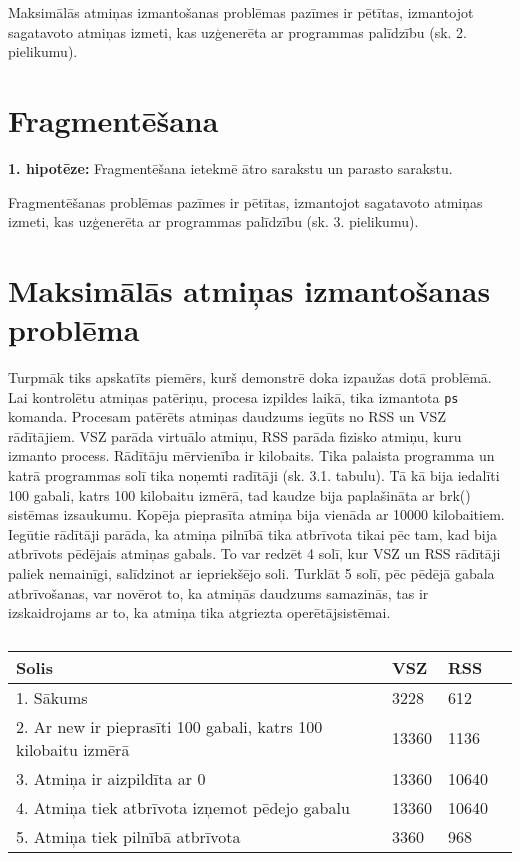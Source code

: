 Maksimālās atmiņas izmantošanas problēmas pazīmes ir pētītas, izmantojot sagatavoto atmiņas izmeti, kas uzģenerēta ar programmas palīdzību (sk. 2. pielikumu).

\section{Fragmentēšana}


\textbf{1. hipotēze:} Fragmentēšana ietekmē ātro sarakstu un parasto sarakstu.

Fragmentēšanas problēmas pazīmes ir pētītas, izmantojot sagatavoto atmiņas izmeti, kas uzģenerēta ar programmas palīdzību (sk. 3. pielikumu).







\section{Maksimālās atmiņas izmantošanas problēma}



Turpmāk tiks apskatīts piemērs, kurš demonstrē doka izpaužas dotā problēmā.
Lai kontrolētu atmiņas patēriņu, procesa izpildes laikā, tika izmantota \texttt{ps} komanda.
Procesam patērēts atmiņas daudzums iegūts no RSS un VSZ rādītājiem.
VSZ parāda virtuālo atmiņu, RSS parāda fizisko atmiņu, kuru izmanto process.
Rādītāju mērvienība ir kilobaits.
Tika palaista programma un katrā programmas solī tika noņemti radītāji (sk. 3.1. tabulu).
Tā kā bija iedalīti 100 gabali, katrs 100 kilobaitu izmērā, tad kaudze bija paplašināta ar brk() sistēmas izsaukumu.
Kopēja pieprasīta atmiņa bija vienāda ar 10000 kilobaitiem.
Iegūtie rādītāji parāda, ka atmiņa pilnībā tika atbrīvota tikai pēc tam, kad bija atbrīvots pēdējais atmiņas gabals.
To var redzēt 4 solī, kur VSZ un RSS rādītāji paliek nemainīgi, salīdzinot ar iepriekšējo soli.
Turklāt 5 solī, pēc pēdējā gabala atbrīvošanas, var novērot to, ka atmiņās daudzums samazinās, tas ir izskaidrojams ar to, ka atmiņa tika atgriezta operētājsistēmai.


\begin{table}[H]
\caption{\textbf{\fontsize{11}{12}\selectfont {Programmas RSS un VSZ radītāji}}}
\label{table:kysymys}
\centering
	\begin{tabular}{|l|l|l|p{5cm}|}
	  \hline
	Solis & VSZ & RSS \\
    \hline
    1. Sākums & 3228 & 612 \\
	\hline
	 2. Ar new ir pieprasīti 100 gabali, katrs 100 kilobaitu izmērā  & 13360  & 1136 \\
      \hline
     3. Atmiņa ir aizpildīta ar 0 &  13360 & 10640\\
      \hline
     4. Atmiņa tiek atbrīvota izņemot pēdejo gabalu & 13360 & 10640 \\
      \hline
     5. Atmiņa tiek pilnībā atbrīvota & 3360 & 968 \\
    \hline
	\end{tabular}
\end{table}

